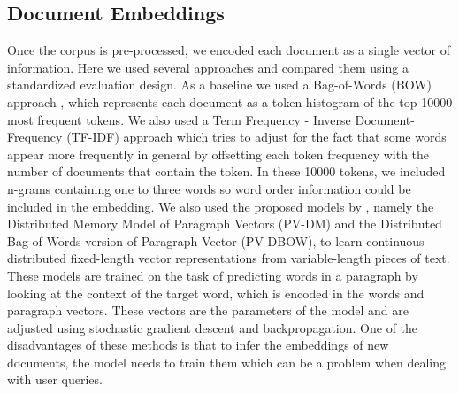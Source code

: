 \documentclass[a4paper]{article}
\begin{document}
\subsection*{Document Embeddings}
Once the corpus is pre-processed, we encoded each document as a single vector of information. Here we used several approaches and compared them using a standardized evaluation design. As a baseline we used a Bag-of-Words (BOW) approach \citep{harris1954}, which represents each document as a token histogram of the top 10000 most frequent tokens. We also used a Term Frequency - Inverse Document-Frequency (TF-IDF) approach \citep{jones1972} which tries to adjust for the fact that some words appear more frequently in general by offsetting each token frequency with the number of documents that contain the token. In these 10000 tokens, we included n-grams containing one to three words so word order information could be included in the embedding. We also used the proposed models by \citet{le2014}, namely the Distributed Memory Model of Paragraph Vectors (PV-DM) and the Distributed Bag of Words version of Paragraph Vector (PV-DBOW), to learn continuous distributed fixed-length vector representations from variable-length pieces of text. These models are trained on the task of predicting words in a paragraph by looking at the context of the target word, which is encoded in the words and paragraph vectors. These vectors are the parameters of the model and are adjusted using stochastic gradient descent and backpropagation. One of the disadvantages of these methods is that to infer the embeddings of new documents, the model needs to train them which can be a problem when dealing with user queries.
\end{document}
